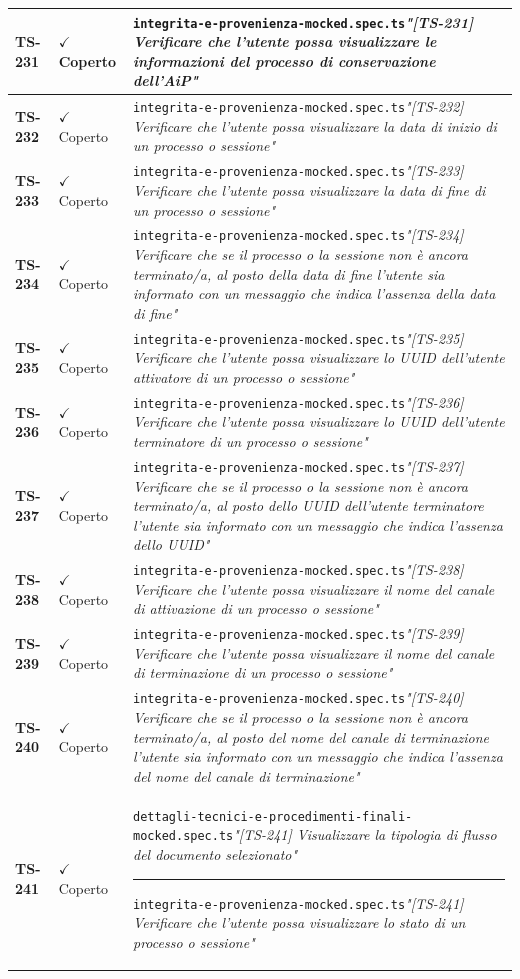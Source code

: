 \documentclass[a4paper,12pt]{article}
\newcommand{\ok}{\textcolor{green!60!black}{$\checkmark$ Coperto}}
\newcommand{\f}[1]{\nolinkurl{#1}\newline}
\newcommand{\q}[1]{\textit{#1}}
\newcommand{\sep}{\newline \vspace{2mm} \hrule \vspace{2mm}}
\begin{document}
\begin{longtable}{|p{1.5cm}|p{3.0cm}|p{10.5cm}|}
\textbf{TS-231} & \ok & \f{integrita-e-provenienza-mocked.spec.ts}\q{"[TS-231] Verificare che l'utente possa visualizzare le informazioni del processo di conservazione dell'AiP"} \\ \hline
\textbf{TS-232} & \ok & \f{integrita-e-provenienza-mocked.spec.ts}\q{"[TS-232] Verificare che l'utente possa visualizzare la data di inizio di un processo o sessione"} \\ \hline
\textbf{TS-233} & \ok & \f{integrita-e-provenienza-mocked.spec.ts}\q{"[TS-233] Verificare che l'utente possa visualizzare la data di fine di un processo o sessione"} \\ \hline
\textbf{TS-234} & \ok & \f{integrita-e-provenienza-mocked.spec.ts}\q{"[TS-234] Verificare che se il processo o la sessione non è ancora terminato/a, al posto della data di fine l'utente sia informato con un messaggio che indica l'assenza della data di fine"} \\ \hline
\textbf{TS-235} & \ok & \f{integrita-e-provenienza-mocked.spec.ts}\q{"[TS-235] Verificare che l'utente possa visualizzare lo UUID dell'utente attivatore di un processo o sessione"} \\ \hline
\textbf{TS-236} & \ok & \f{integrita-e-provenienza-mocked.spec.ts}\q{"[TS-236] Verificare che l'utente possa visualizzare lo UUID dell'utente terminatore di un processo o sessione"} \\ \hline
\textbf{TS-237} & \ok & \f{integrita-e-provenienza-mocked.spec.ts}\q{"[TS-237] Verificare che se il processo o la sessione non è ancora terminato/a, al posto dello UUID dell'utente terminatore l'utente sia informato con un messaggio che indica l'assenza dello UUID"} \\ \hline
\textbf{TS-238} & \ok & \f{integrita-e-provenienza-mocked.spec.ts}\q{"[TS-238] Verificare che l'utente possa visualizzare il nome del canale di attivazione di un processo o sessione"} \\ \hline
\textbf{TS-239} & \ok & \f{integrita-e-provenienza-mocked.spec.ts}\q{"[TS-239] Verificare che l'utente possa visualizzare il nome del canale di terminazione di un processo o sessione"} \\ \hline
\textbf{TS-240} & \ok & \f{integrita-e-provenienza-mocked.spec.ts}\q{"[TS-240] Verificare che se il processo o la sessione non è ancora terminato/a, al posto del nome del canale di terminazione l'utente sia informato con un messaggio che indica l'assenza del nome del canale di terminazione"} \\ \hline
\textbf{TS-241} & \ok & \f{dettagli-tecnici-e-procedimenti-finali-mocked.spec.ts}\q{"[TS-241] Visualizzare la tipologia di flusso del documento selezionato"} \sep \f{integrita-e-provenienza-mocked.spec.ts}\q{"[TS-241] Verificare che l'utente possa visualizzare lo stato di un processo o sessione"} \\ \hline

\end{longtable}
\end{document}

